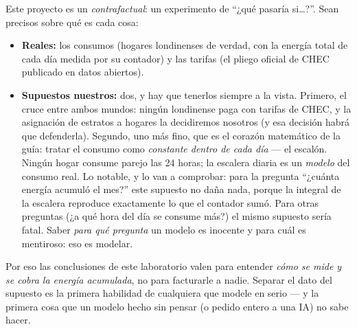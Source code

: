 \documentclass[12pt,letterpaper]{article}
\begin{document}
\begin{cajareal}
Este proyecto es un \emph{contrafactual}: un experimento de ``¿qué pasaría si\ldots?''. Sean precisos sobre qué es cada cosa:
\begin{itemize}[itemsep=0.1em]
    \item \textbf{Reales:} los consumos (hogares londinenses de verdad, con la energía total de cada día medida por su contador) y las tarifas (el pliego oficial de CHEC publicado en datos abiertos).
    \item \textbf{Supuestos nuestros:} dos, y hay que tenerlos siempre a la vista. Primero, el cruce entre ambos mundos: ningún londinense paga con tarifas de CHEC, y la asignación de estratos a hogares la decidiremos nosotros (y esa decisión habrá que defenderla). Segundo, uno más fino, que es el corazón matemático de la guía: tratar el consumo como \emph{constante dentro de cada día} --- el escalón. Ningún hogar consume parejo las 24 horas; la escalera diaria es un \emph{modelo} del consumo real. Lo notable, y lo van a comprobar: para la pregunta ``¿cuánta energía acumuló el mes?'' este supuesto no daña nada, porque la integral de la escalera reproduce exactamente lo que el contador sumó. Para otras preguntas (¿a qué hora del día se consume más?) el mismo supuesto sería fatal. Saber \emph{para qué pregunta} un modelo es inocente y para cuál es mentiroso: eso es modelar.
\end{itemize}
Por eso las conclusiones de este laboratorio valen para entender \emph{cómo se mide y se cobra la energía acumulada}, no para facturarle a nadie. Separar el dato del supuesto es la primera habilidad de cualquiera que modele en serio --- y la primera cosa que un modelo hecho sin pensar (o pedido entero a una IA) no sabe hacer.
\end{cajareal}
\end{document}
